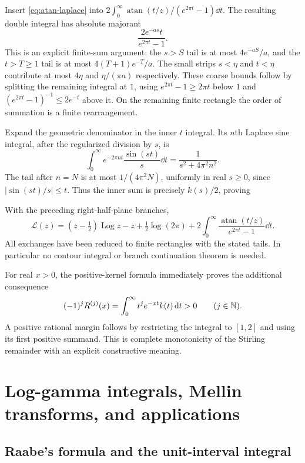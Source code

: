 Insert \eqref{eq:atan-laplace} into
$2\int_0^\infty\operatorname{atan}(t/z)/(e^{2\pi t}-1)\dd t$.
The resulting double integral has absolute majorant
\[
 \frac{2e^{-as}t}{e^{2\pi t}-1}.
\]
This is an explicit finite-sum argument: the $s>S$ tail is at most
$4e^{-aS}/a$, and the $t>T\ge1$ tail is at most
$4(T+1)e^{-T}/a$. The small strips $s<\eta$ and $t<\eta$
contribute at most $4\eta$ and $\eta/(\pi a)$ respectively.
These coarse bounds follow by splitting the remaining integral at $1$,
using $e^{2\pi t}-1\ge2\pi t$ below $1$ and
$(e^{2\pi t}-1)^{-1}\le2e^{-t}$ above it.
On the remaining finite rectangle the order of summation is a finite
rearrangement.

Expand the geometric denominator in the inner $t$ integral. Its $n$th
Laplace sine integral, after the regularized division by $s$, is
\[
 \int_0^\infty e^{-2\pi nt}\frac{\sin(st)}s\dd t
              =\frac1{s^2+4\pi^2n^2}.
\]
The tail after $n=N$ is at most $1/(4\pi^2N)$, uniformly in real
$s\ge0$, since $|\sin(st)/s|\le t$. Thus the inner sum is precisely
$k(s)/2$, proving
\begin{theorem}
With the preceding right-half-plane branches,
\[
 \boxed{\displaystyle
 \mathcal L(z)=(z-\tfrac12)\operatorname{Log}z-z
 +\tfrac12\log(2\pi)
 +2\int_0^\infty
       \frac{\operatorname{atan}(t/z)}{e^{2\pi t}-1}\dd t.}
\]
All exchanges have been reduced to finite rectangles with the stated
tails. In particular no contour integral or branch continuation theorem
is needed.
\end{theorem}

For real $x>0$, the positive-kernel formula immediately proves the
additional consequence
\[
 (-1)^j R^{(j)}(x)=\int_0^\infty t^je^{-xt}k(t)\,\mathrm d t>0
 \qquad(j\in\mathbb N).
\]
A positive rational margin follows by restricting the integral to
$[1,2]$ and using its first positive summand. This is complete
monotonicity of the Stirling remainder with an explicit constructive
meaning.

\section{Log-gamma integrals, Mellin transforms, and applications}
\label{sec:further}

\subsection{Raabe's formula and the unit-interval integral}


